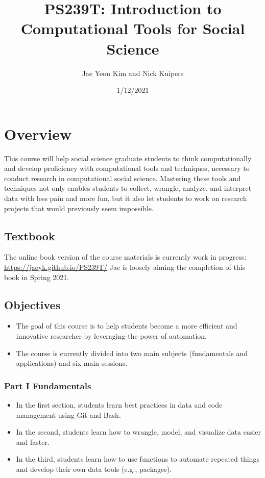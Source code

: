 \documentclass[
]{article}
\title{PS239T: Introduction to Computational Tools for Social Science}
\author{Jae Yeon Kim and Nick Kuipers}
\date{1/12/2021}
\begin{document}
\maketitle

\hypertarget{overview}{%
\section{Overview}\label{overview}}

This course will help social science graduate students to think
computationally and develop proficiency with computational tools and
techniques, necessary to conduct research in computational social
science. Mastering these tools and techniques not only enables students
to collect, wrangle, analyze, and interpret data with less pain and more
fun, but it also let students to work on research projects that would
previously seem impossible.

\hypertarget{textbook}{%
\subsection{Textbook}\label{textbook}}

The online book version of the course materials is currently work in
progress: \url{https://jaeyk.github.io/PS239T/} Jae is loosely aiming
the completion of this book in Spring 2021.

\hypertarget{objectives}{%
\subsection{Objectives}\label{objectives}}

\begin{itemize}
\item
  The goal of this course is to help students become a more efficient
  and innovative researcher by leveraging the power of automation.
\item
  The course is currently divided into two main subjects (fundamentals
  and applications) and six main sessions.
\end{itemize}

\hypertarget{part-i-fundamentals}{%
\subsubsection{Part I Fundamentals}\label{part-i-fundamentals}}

\begin{itemize}
\item
  In the first section, students learn best practices in data and code
  management using Git and Bash.
\item
  In the second, students learn how to wrangle, model, and visualize
  data easier and faster.
\item
  In the third, students learn how to use functions to automate repeated
  things and develop their own data tools (e.g., packages).
\end{itemize}
\end{document}
